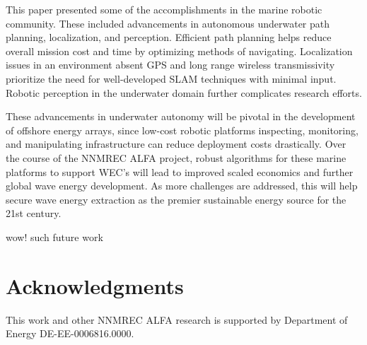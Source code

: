 \documentclass[letterpaper, 10pt, conference]{IEEEtran}
\begin{document}
This paper presented some of the accomplishments in the marine robotic community. These included advancements in autonomous underwater path planning, localization, and perception. Efficient path planning helps reduce overall mission cost and time by optimizing methods of navigating. Localization issues in an environment absent GPS and long range wireless transmissivity prioritize the need for well-developed SLAM techniques with minimal input. Robotic perception in the underwater domain further complicates research efforts. 

These advancements in underwater autonomy will be pivotal in the development of offshore energy arrays, since low-cost robotic platforms inspecting, monitoring, and manipulating infrastructure can reduce deployment costs drastically. Over the course of the NNMREC ALFA project, robust algorithms for these marine platforms to support WEC's will lead to improved scaled economics and further global wave energy development. As more challenges are addressed, this will help secure wave energy extraction as the premier sustainable energy source for the 21st century.

wow! such future work




\section*{Acknowledgments}
This work and other NNMREC ALFA research is supported by Department of Energy DE-EE-0006816.0000.

\ifCLASSOPTIONcaptionsoff
  \newpage
\fi


\nocite{huynh, geoffadapt, geoffuncertainty, colby, brekken1, brekken2, bosma, ballard, MAS}




\end{document}
